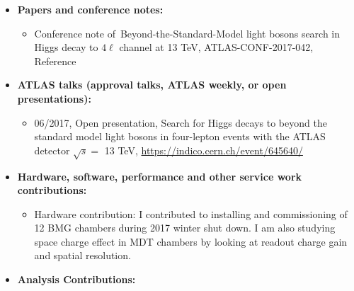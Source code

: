 \begin{itemize}

\item \textbf{Papers and conference notes:}

    \begin{itemize}
        \item Conference note of~Beyond-the-Standard-Model light bosons search in Higgs decay to $4\ell$ channel at 13 TeV,  ATLAS-CONF-2017-042, Reference~\cite{ATLAS-CONF-2017-042}
    \end{itemize}
%

\item \textbf{ATLAS talks (approval talks, ATLAS weekly, or open presentations):}

    \begin{itemize}
        \item 06/2017, Open presentation, Search for Higgs decays to beyond the standard model light bosons in four-lepton events with the ATLAS detector $\sqrt{s}=$ 13 TeV, \url{https://indico.cern.ch/event/645640/}
    \end{itemize}
%
\item \textbf{Hardware, software, performance and other service work contributions:}

        \begin{itemize}
       	 \item Hardware contribution: I contributed to installing and commissioning of 12 BMG chambers during 2017 winter shut down. I am also studying space charge effect in MDT chambers by looking at readout charge gain and spatial resolution.
        \end{itemize}
\item \textbf{Analysis Contributions:}


\end{itemize}
